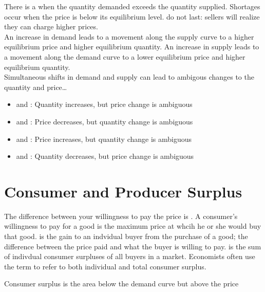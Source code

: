 \documentclass{article}
\begin{document}
There is a  when the quantity demanded exceeds the quantity supplied. Shortages occur when the price is below its equilibrium level.  do not last: sellers will realize they can charge higher prices. \\ 

An increase in demand leads to a movement along the supply curve to a higher equilibrium price and higher equilibrium quantity. An increase in supply leads to a movement along the demand curve to a lower equilibrium price and higher equilibrium quantity. \\ 

Simultaneous shifts in demand and supply can lead to ambigous changes to the quantity and price\dots 
\begin{itemize}
  \item {} and : Quantity increases, but price change is ambiguous 
  \item {} and : Price decreases, but quantity change is ambiguous
  \item {} and : Price increases, but quantity change is ambiguous 
  \item {} and : Quantity decreases, but price change is ambiguous
\end{itemize}

\section{Consumer and Producer Surplus}

The difference between your willingness to pay the price is . A consumer's willingness to pay for a good is the maximum price at whcih he or she would buy that good.  is the gain to an indvidual buyer from the purchase of a good; the difference between the price paid and what the buyer is willing to pay.  is the sum of indivdual consumer surpluses of all buyers in a market. Economists often use the term  to refer to both individual and total consumer surplus.\\ 

\begin{remark}
  Consumer surplus is the area below the demand curve but above the price
\end{remark}
\end{document}

